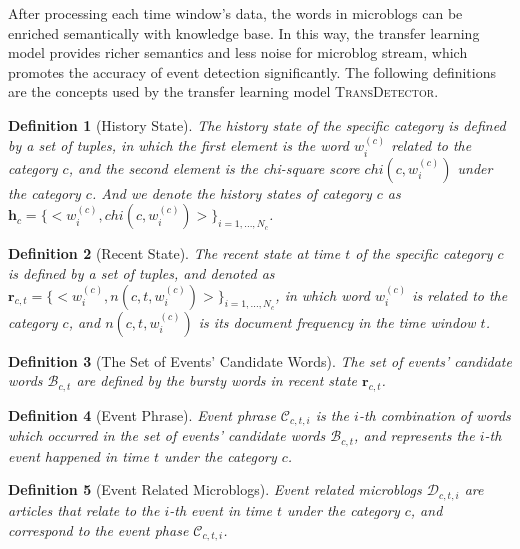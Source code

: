 \documentclass{article}
\newtheorem{rmk}{Definition}%
\begin{document}
After processing each time window's data, the words in microblogs can be enriched semantically with knowledge base.
In this way, the transfer learning model provides richer semantics and less noise for microblog stream, which promotes the accuracy of event detection significantly. 
The following definitions are the concepts used by the transfer learning model \textsc{TransDetector}. 

\begin{rmk}[History State] 
The history state of the specific category is defined by a set of tuples, in which the first element is the word \(w^{(c)}_i\) related to the category \(c\), and the second element is the chi-square score \(chi(c,w^{(c)}_{i})\) under the category \(c\). 
And we denote the history states of category \(c\) as \(\bm{h}_c=\{<w^{(c)}_i,chi(c,w^{(c)}_{i})>\}_{i=1,...,N_c}\).
\end{rmk}

\begin{rmk}[Recent State] 
The recent state at time \(t\) of the specific category \(c\) is defined by a set of tuples, and denoted as \(\bm{r}_{c,t}=\{<w^{(c)}_i,n(c,t,w^{(c)}_{i})>\}_{i=1,...,N_c}\), in which word \(w^{(c)}_{i}\) is related to the category \(c\), and \(n(c,t,w^{(c)}_{i})\) is its document frequency in the time window \(t\).
\end{rmk}

\begin{rmk}[The Set of Events' Candidate Words] 
The set of events' candidate words \(\mathcal{B}_{c,t}\) are defined by the bursty words in recent state \(\bm{r}_{c,t}\).
\end{rmk}

\begin{rmk}[Event Phrase] 
Event phrase \(\mathcal{C}_{c,t,i}\) is the \(i\)-th combination of words which occurred in the set of events' candidate words \(\mathcal{B}_{c,t}\), and represents the \(i\)-th event happened in time \(t\) under the category \(c\).
\end{rmk}

\begin{rmk}[Event Related Microblogs] Event related microblogs \(\mathcal{D}_{c,t,i}\) are articles that relate to the \(i\)-th event in time \(t\) under the category \(c\), and correspond to the event phase \(\mathcal{C}_{c,t,i}\).
\end{rmk}
\end{document}

